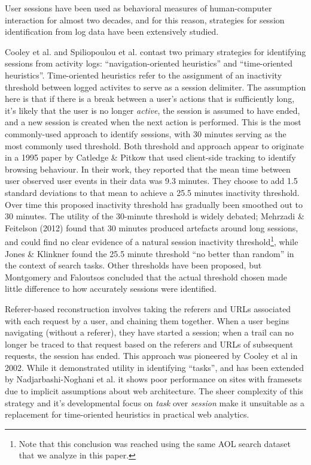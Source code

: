 User sessions have been used as behavioral measures of human-computer interaction for almost two decades, and for this reason, strategies for session identification from log data have been extensively studied\cite{eickhoff2014lessons}.

Cooley et al.\cite{cooley1999data} and Spiliopoulou et al.\cite{spiliopoulou2003framework} contast two primary strategies for identifying sessions from activity logs: ``navigation-oriented heuristics'' and ``time-oriented heuristics''.  Time-oriented heuristics refer to the assignment of an inactivity threshold between logged activites to serve as a session delimiter.  The assumption here is that if there is a break between a user's actions that is sufficiently long, it's likely that the user is no longer \emph{active}, the session is assumed to have ended, and a new session is created when the next action is performed. This is the most commonly-used approach to identify sessions, with 30 minutes serving as the most commonly used threshold\cite{spiliopoulou2003framework,eickhoff2014lessons,ortega2010differences}.  Both threshold and approach appear to originate in a 1995 paper by Catledge \& Pitkow\cite{catledge1995characterizing} that used client-side tracking to identify browsing behaviour. In their work, they reported that the mean time between user observed user events in their data was 9.3 minutes.  They choose to add 1.5 standard deviations to that mean to achieve a 25.5 minutes inactivity threshold.  Over time this proposed inactivity threshold has gradually been smoothed out to 30 minutes.  The utility of the 30-minute threshold is widely debated; Mehrzadi \& Feitelson (2012) \cite{mehrzadi2012onextracting} found that 30 minutes produced artefacts around long sessions, and could find no clear evidence of a natural session inactivity threshold\footnote{Note that this conclusion was reached using the same AOL search dataset that we analyze in this paper.}, while Jones \& Klinkner\cite{jones2008beyond} found the 25.5 minute threshold ``no better than random'' in the context of search tasks. Other thresholds have been proposed, but Montgomery and Faloutsos\cite{montgomery2001identifying} concluded that the actual threshold chosen made little difference to how accurately sessions were identified.

Referer-based reconstruction involves taking the referers and URLs associated with each request by a user, and chaining them together. When a user begins navigating (without a referer), they have started a session; when a trail can no longer be traced to that request based on the referers and URLs of subsequent requests, the session has ended.  This approach was pioneered by Cooley et al in 2002\cite{cooley1999data}.  While it demonstrated utility in identifying ``tasks'', and has been extended by Nadjarbashi-Noghani et al.\cite{nadjarbashi2004improving} it shows poor performance on sites with framesets due to implicit assumptions about web architecture\cite{berendt2003impact}. The sheer complexity of this strategy and it's developmental focus on \emph{task} over \emph{session} make it unsuitable as a replacement for time-oriented heuristics in practical web analytics.

